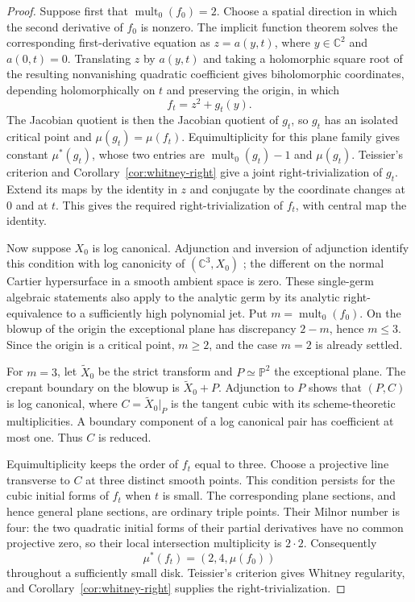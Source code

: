 \begin{proof}
Suppose first that $\operatorname{mult}_0(f_0)=2$.  Choose a spatial
direction in which the second derivative of $f_0$ is nonzero.  The implicit
function theorem solves the corresponding first-derivative equation as
$z=a(y,t)$, where $y\in\mathbb C^2$ and $a(0,t)=0$.  Translating $z$ by
$a(y,t)$ and taking a holomorphic square root of the resulting nonvanishing
quadratic coefficient gives biholomorphic coordinates, depending
holomorphically on $t$ and preserving the origin, in which
\[
 f_t=z^2+g_t(y).
\]
The Jacobian quotient is then the Jacobian quotient of $g_t$, so $g_t$ has
an isolated critical point and $\mu(g_t)=\mu(f_t)$.  Equimultiplicity for
this plane family gives constant $\mu^*(g_t)$, whose two entries are
$\operatorname{mult}_0(g_t)-1$ and $\mu(g_t)$.  Teissier's criterion and
Corollary~\ref{cor:whitney-right} give a joint
right-trivialization of $g_t$.  Extend its maps by the identity in $z$ and
conjugate by the coordinate changes at $0$ and at $t$.  This gives the
required right-trivialization of $f_t$, with central map the identity.

Now suppose $X_0$ is log canonical.  Adjunction and inversion of
adjunction identify this condition with log canonicity of
$(\mathbb C^3,X_0)$ \cite{Kawakita2007}; the different on the normal
Cartier hypersurface in a smooth ambient space is zero.  These
single-germ algebraic statements also apply to the analytic germ by its
analytic right-equivalence to a sufficiently high polynomial jet.
Put $m=\operatorname{mult}_0(f_0)$.  On the blowup of the origin the
exceptional plane has discrepancy $2-m$, hence $m\leq3$.  Since the
origin is a critical point, $m\geq2$, and the case $m=2$ is already settled.

For $m=3$, let $\widetilde X_0$ be the strict transform and $P\simeq
\mathbb P^2$ the exceptional plane.  The crepant boundary on the blowup
is $\widetilde X_0+P$.  Adjunction to $P$ shows that
$(P,C)$ is log canonical, where $C=\widetilde X_0|_P$ is the tangent
cubic with its scheme-theoretic multiplicities.  A boundary component of
a log canonical pair has coefficient at most one.  Thus $C$ is reduced.

Equimultiplicity keeps the order of $f_t$ equal to three.  Choose a
projective line transverse to $C$ at three distinct smooth points.  This
condition persists for the cubic initial forms of $f_t$ when $t$ is
small.  The corresponding plane sections, and hence general plane
sections, are ordinary triple points.  Their Milnor number is four:
the two quadratic initial forms of their partial derivatives have no
common projective zero, so their local intersection multiplicity is
$2\cdot2$.  Consequently
\[
 \mu^*(f_t)=(2,4,\mu(f_0))
\]
throughout a sufficiently small disk.  Teissier's criterion gives Whitney
regularity, and Corollary~\ref{cor:whitney-right} supplies the
right-trivialization.
\end{proof}


